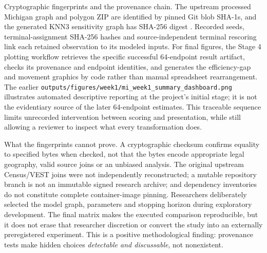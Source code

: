 \documentclass[
  10pt,
]{article}
\begin{document}
Cryptographic fingerprints and the provenance chain. The upstream
processed Michigan graph and polygon ZIP are identified by pinned Git
blob SHA-1s, and the generated KNN3 sensitivity graph has SHA-256 digest
\texttt{}.
Recorded seeds, terminal-assignment SHA-256 hashes and
source-independent terminal rescoring link each retained observation to
its modeled inputs. For final figures, the Stage 4 plotting workflow
retrieves the specific successful 64-endpoint result artifact, checks
its provenance and endpoint identities, and generates the efficiency-gap
and movement graphics by code rather than manual spreadsheet
rearrangement. The earlier
\texttt{outputs/figures/week1/mi\_week1\_summary\_dashboard.png}
illustrates automated descriptive reporting at the project's initial
stage; it is not the evidentiary source of the later 64-endpoint
estimates. This traceable sequence limits unrecorded intervention
between scoring and presentation, while still allowing a reviewer to
inspect what every transformation does.

What the fingerprints cannot prove. A cryptographic checksum confirms
equality to specified bytes when checked, not that the bytes encode
appropriate legal geography, valid source joins or an unbiased analysis.
The original upstream Census/VEST joins were not independently
reconstructed; a mutable repository branch is not an immutable signed
research archive; and dependency inventories do not constitute complete
container-image pinning. Researchers deliberately selected the model
graph, parameters and stopping horizon during exploratory development.
The final matrix makes the executed comparison reproducible, but it does
not erase that researcher discretion or convert the study into an
externally preregistered experiment. This is a positive methodological
finding: provenance tests make hidden choices \emph{detectable and
discussable}, not nonexistent.
\end{document}
